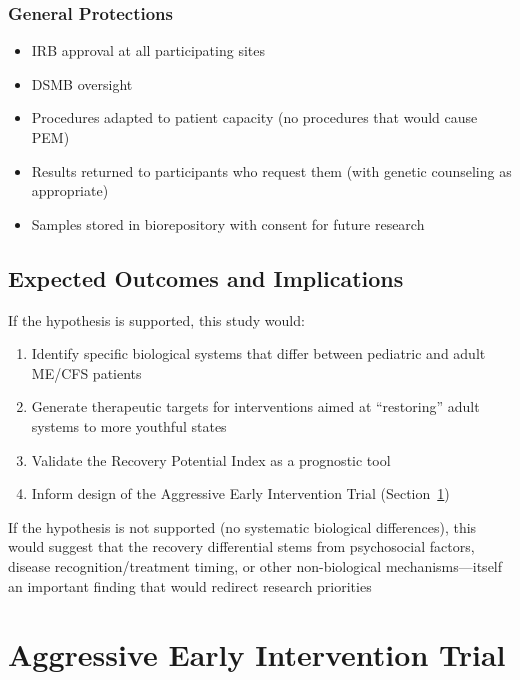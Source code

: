 \subsubsection{General Protections}
\begin{itemize}
    \item IRB approval at all participating sites
    \item DSMB oversight
    \item Procedures adapted to patient capacity (no procedures that would cause PEM)
    \item Results returned to participants who request them (with genetic counseling as appropriate)
    \item Samples stored in biorepository with consent for future research
\end{itemize}

\subsection{Expected Outcomes and Implications}

If the hypothesis is supported, this study would:
\begin{enumerate}
    \item Identify specific biological systems that differ between pediatric and adult ME/CFS patients
    \item Generate therapeutic targets for interventions aimed at ``restoring'' adult systems to more youthful states
    \item Validate the Recovery Potential Index as a prognostic tool
    \item Inform design of the Aggressive Early Intervention Trial (Section~\ref{sec:early-intervention-trial})
\end{enumerate}

If the hypothesis is not supported (no systematic biological differences), this would suggest that the recovery differential stems from psychosocial factors, disease recognition/treatment timing, or other non-biological mechanisms---itself an important finding that would redirect research priorities

\section{Aggressive Early Intervention Trial}
\label{sec:early-intervention-trial}

